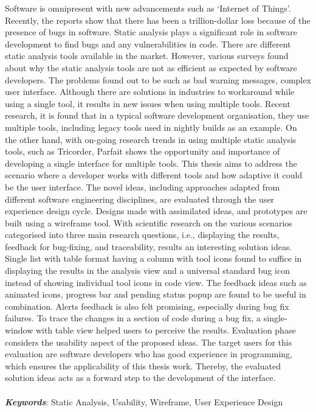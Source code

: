 Software is omnipresent with new advancements such as ‘Internet of Things’. Recently, the reports show that there has been a trillion-dollar loss because of the presence of bugs in software. Static analysis plays a significant role in software development to find bugs and any vulnerabilities in code. There are different static analysis tools available in the market. However, various surveys found about why the static analysis tools are not as efficient as expected by software developers. The problems found out to be such as bad warning messages, complex user interface. Although there are solutions in industries to workaround while using a single tool, it results in new issues when using multiple tools. Recent research, it is found that in a typical software development organisation, they use multiple tools, including legacy tools used in nightly builds as an example. On the other hand, with on-going research trends in using multiple static analysis tools, such as Tricorder, Parfait shows the opportunity and importance of developing a single interface for multiple tools. This thesis aims to address the scenario where a developer works with different tools and how adaptive it could be the user interface. The novel ideas, including approaches adapted from different software engineering disciplines, are evaluated through the user experience design cycle. Designs made with assimilated ideas, and prototypes are built using a wireframe tool. With scientific research on the various scenarios categorised into three main research questions, i.e., displaying the results, feedback for bug-fixing, and traceability, results an interesting solution ideas. Single list with table format having a column with tool icons found to suffice in displaying the results in the analysis view and a universal standard bug icon instead of showing individual tool icons in code view. The feedback ideas such as animated icons, progress bar and pending status popup are found to be useful in combination. Alerts feedback is also felt promising, especially during bug fix failures. To trace the changes in a section of code during a bug fix, a single-window with table view helped users to perceive the results. Evaluation phase considers the usability aspect of the proposed ideas. The target users for this evaluation are software developers who has good experience in programming, which ensures the applicability of this thesis work. Thereby, the evaluated solution ideas acts as a forward step to the development of the interface. \\ \\
\textbf{\textit{Keywords}}: Static Analysis, Usability, Wireframe, User Experience Design
